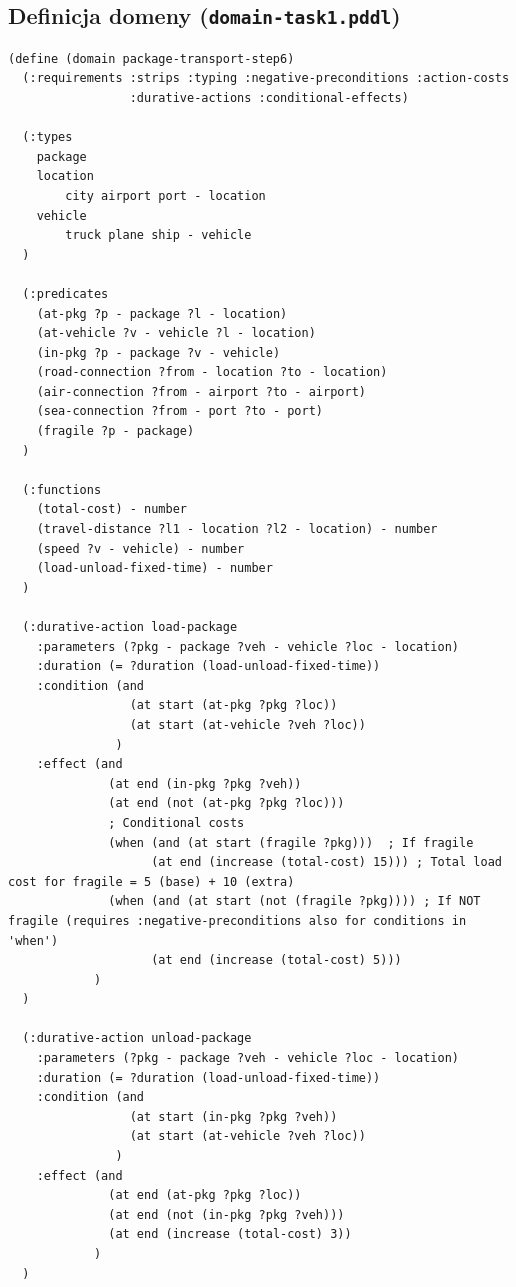 \documentclass[11pt,a4paper]{article}
\begin{document}
\subsection{Definicja domeny (\texttt{domain-task1.pddl})}

\begin{lstlisting}[caption=Domena zadania 1, label=lst:req_task1]
(define (domain package-transport-step6)
  (:requirements :strips :typing :negative-preconditions :action-costs 
                 :durative-actions :conditional-effects)

  (:types
    package
    location
        city airport port - location
    vehicle
        truck plane ship - vehicle
  )

  (:predicates
    (at-pkg ?p - package ?l - location)
    (at-vehicle ?v - vehicle ?l - location)
    (in-pkg ?p - package ?v - vehicle)
    (road-connection ?from - location ?to - location)
    (air-connection ?from - airport ?to - airport)
    (sea-connection ?from - port ?to - port)
    (fragile ?p - package)
  )

  (:functions
    (total-cost) - number
    (travel-distance ?l1 - location ?l2 - location) - number
    (speed ?v - vehicle) - number
    (load-unload-fixed-time) - number
  )

  (:durative-action load-package
    :parameters (?pkg - package ?veh - vehicle ?loc - location)
    :duration (= ?duration (load-unload-fixed-time))
    :condition (and
                 (at start (at-pkg ?pkg ?loc))
                 (at start (at-vehicle ?veh ?loc))
               )
    :effect (and
              (at end (in-pkg ?pkg ?veh))
              (at end (not (at-pkg ?pkg ?loc)))
              ; Conditional costs
              (when (and (at start (fragile ?pkg)))  ; If fragile
                    (at end (increase (total-cost) 15))) ; Total load cost for fragile = 5 (base) + 10 (extra)
              (when (and (at start (not (fragile ?pkg)))) ; If NOT fragile (requires :negative-preconditions also for conditions in 'when')
                    (at end (increase (total-cost) 5)))
            )
  )

  (:durative-action unload-package
    :parameters (?pkg - package ?veh - vehicle ?loc - location)
    :duration (= ?duration (load-unload-fixed-time))
    :condition (and
                 (at start (in-pkg ?pkg ?veh))
                 (at start (at-vehicle ?veh ?loc))
               )
    :effect (and
              (at end (at-pkg ?pkg ?loc))
              (at end (not (in-pkg ?pkg ?veh)))
              (at end (increase (total-cost) 3))
            )
  )


\end{lstlisting}
\end{document}
